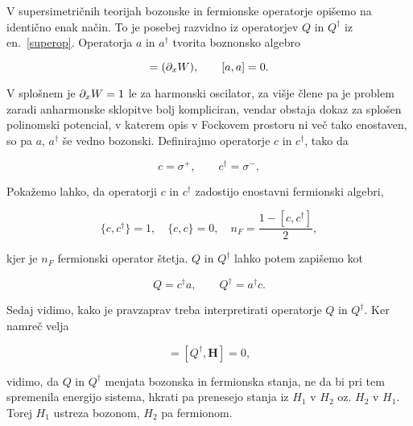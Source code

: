 V supersimetri\v cnih teorijah bozonske in fermionske operatorje opi\v semo na identi\v cno enak
na\v cin. To je posebej razvidno iz operatorjev $Q$ in $Q^\dagger$ iz en.~\eqref{superop}. Operatorja
$a$ in $a^\dagger$ tvorita boznonsko algebro

\begin{equation}
	[a, a^\dagger] = (\px W), \qquad [a, a] = 0.
\end{equation}

\ni V splo\v snem je $\partial_x W = 1$ le za harmonski oscilator, za vi\v sje \v clene pa je problem zaradi anharmonske
sklopitve bolj kompliciran, vendar obstaja dokaz za splo\v sen polinomski potencial, v katerem
opis v Fockovem prostoru ni ve\v c tako enostaven, so pa $a$, $a^\dagger$ \v se vedno bozonski.
Definirajmo operatorje $c$ in $c^\dagger$, tako da

\begin{equation}
	c = \sigma^+, \qquad c^\dagger = \sigma^-,
\end{equation}

\ni Poka\v zemo lahko, da operatorji $c$ in $c^\dagger$ zadostijo enostavni fermionski algebri,

\begin{equation}
	\{c, c^\dagger\} = 1, \quad \{c, c\} = 0, \quad n_F = \frac{1 - [c,c^\dagger]}{2},
\end{equation}

\ni kjer je $n_F$ fermionski operator \v stetja. $Q$ in $Q^\dagger$ lahko potem zapi\v semo kot

\begin{equation}
	Q = c^\dagger a, \qquad Q^\dagger = a^\dagger c.
\end{equation}

\ni Sedaj vidimo, kako je pravzaprav treba interpretirati operatorje $Q$ in $Q^\dagger$. Ker namre\v c
velja

\begin{equation}
	[Q, \mathbf{H}] = [Q^\dagger, \mathbf{H}] = 0,
\end{equation}

\ni vidimo, da $Q$ in $Q^\dagger$ menjata bozonska in fermionska stanja, ne da bi pri tem spremenila energijo sistema,
hkrati pa prenesejo stanja iz $H_1$ v $H_2$ oz. $H_2$ v $H_1$. Torej $H_1$ ustreza bozonom, $H_2$ pa fermionom.

